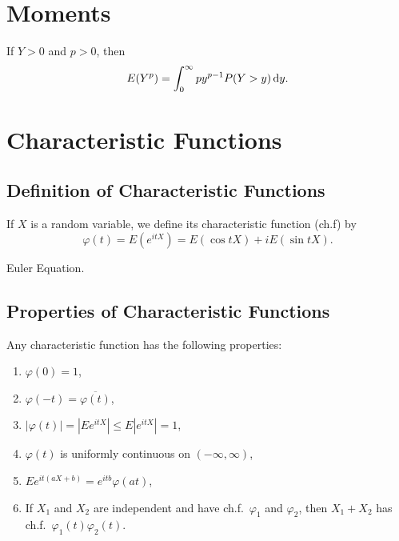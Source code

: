 \section{Moments}

\begin{lemma}
	If \(Y>0\) and \(p>0\), then
	\begin{equation}
		E(Y^p)=\int_{0}^{\infty}py^{p-1}P(Y>y)\mathop{}\!\mathrm{d} y.
	\end{equation}
\end{lemma}

\section{Characteristic Functions}

\subsection{Definition of Characteristic Functions}

\begin{definition}\label{def:characteristic-function}
	If \(X\) is a random variable, we define its characteristic function (ch.f) by
	\begin{equation}
		\varphi(t)=E\left(e^{itX}\right)=E\left(\cos tX\right)+i E\left(\sin tX\right).
	\end{equation}
\end{definition}

\begin{remark}
	Euler Equation.
\end{remark}

\subsection{Properties of Characteristic Functions}

\begin{theorem}\label{thm:characteristic-function-property}
	Any characteristic function has the following properties:
	\begin{enumerate}
		\item \(\varphi(0) = 1\),
		\item \(\varphi(-t) = \overline{\varphi(t)}\),
		\item \(|\varphi(t)| =|Ee^{itX}| \leq E|e^{itX}| = 1\),
		\item \(\varphi(t)\) is uniformly continuous on \((- \infty,\infty)\),
		\item \(Ee^{it(aX+b)}=e^{itb}\varphi(at)\),
		\item  If \(X_1\) and \(X_2\) are independent and have ch.f.\ \(\varphi_1\) and \(\varphi_2\), then \(X_1+X_2\) has ch.f.\ \(\varphi_1(t)\varphi_2(t)\).
	\end{enumerate}
\end{theorem}


